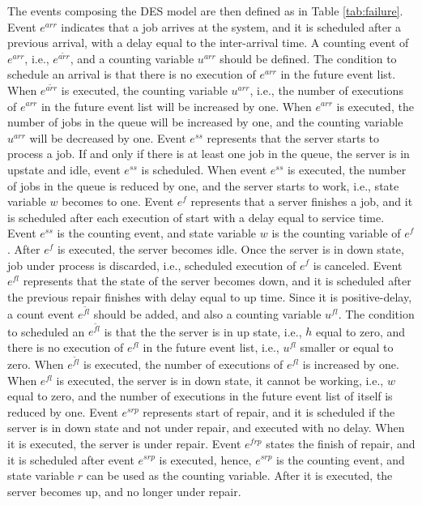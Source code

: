 \documentclass[]{interact}
\theoremstyle{plain}%
\theoremstyle{definition}
\theoremstyle{remark}
\begin{document}
The events composing the DES model are then defined as in Table \ref{tab:failure}. Event $e^{arr}$ indicates that a job arrives at the system, and it is scheduled after a previous arrival, with a delay equal to the inter-arrival time. A counting event of $e^{arr}$, i.e., $e^{\tilde{arr}}$, and a counting variable $u^{arr}$ should be defined. The condition to schedule an arrival is that there is no execution of $e^{arr}$ in the future event list. When $e^{\tilde{arr}}$ is executed, the counting variable $u^{arr}$, i.e., the number of executions of $e^{arr}$ in the future event list will be increased by one. When $e^{arr}$ is executed, the number of jobs in the queue will be increased by one, and the counting variable $u^{arr}$ will be decreased by one. Event $e^{ss}$ represents that the server starts to process a job. If and only if there is at least one job in the queue, the server is in upstate and idle, event $e^{ss}$ is scheduled. When event $e^{ss}$ is executed, the number of jobs in the queue is reduced by one, and the server starts to work, i.e., state variable $w$ becomes to one. Event $e^{f}$ represents that a server finishes a job, and it is scheduled after each execution of start with a delay equal to service time. Event $e^{ss}$ is the counting event, and state variable $w$ is the counting variable of $e^{f}$. After $e^{f}$ is executed, the server becomes idle. Once the server is in down state, job under process is discarded, i.e., scheduled execution of $e^{f}$ is canceled. Event $e^{fl}$ represents that the state of the server becomes down, and it is scheduled after the previous repair finishes with delay equal to up time. Since it is positive-delay, a count event $e^{\tilde{fl}}$ should be added, and also a counting variable $u^{fl}$. The condition to scheduled an $e^{\tilde{fl}}$ is that the the server is in up state, i.e., $h$ equal to zero, and there is no execution of $e^{fl}$ in the future event list, i.e., $u^{fl}$ smaller or equal to zero. When $e^{\tilde{fl}}$ is executed, the number of executions of $e^{fl}$ is increased by one. When $e^{fl}$ is executed, the server is in down state, it cannot be working, i.e., $w$ equal to zero, and the number of executions in the future event list of itself is reduced by one. Event $e^{srp}$ represents start of repair, and it is scheduled if the server is in down state and not under repair, and executed with no delay. When it is executed, the server is under repair. Event $e^{frp}$ states the finish of repair, and it is scheduled after event $e^{srp}$ is executed, hence, $e^{srp}$ is the counting event, and state variable $r$ can be used as the counting variable. After it is executed, the server becomes up, and no longer under repair. %
\end{document}
